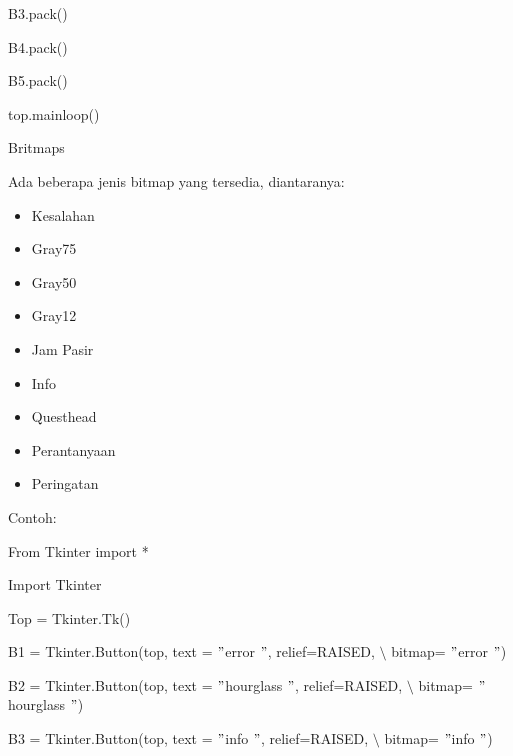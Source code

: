\begin{itemize}
{\fontsize{10pt}{10pt}\selectfont B3.pack()} \par
{\fontsize{10pt}{10pt}\selectfont B4.pack()} \par
{\fontsize{10pt}{10pt}\selectfont B5.pack()} \par
{\fontsize{10pt}{10pt}\selectfont top.mainloop()} \par
\noindent 
Britmaps \par
\noindent 
Ada beberapa jenis bitmap yang tersedia, diantaranya: \par
\noindent 
\begin{itemize}
\item Kesalahan \par
\noindent 
\item Gray75 \par
\noindent 
\item Gray50 \par
\noindent 
\item Gray12 \par
\noindent 
\item Jam Pasir \par
\noindent 
\item Info \par
\noindent 
\item Questhead \par
\noindent 
\item Perantanyaan  \par
\noindent 
\item Peringatan\end{itemize}
 \par
\vspace{12pt}
Contoh: \par
{\fontsize{10pt}{10pt}\selectfont From Tkinter import *} \par
{\fontsize{10pt}{10pt}\selectfont Import Tkinter} \par
\vspace{10pt}
{\fontsize{10pt}{10pt}\selectfont Top = Tkinter.Tk()} \par
\vspace{10pt}
{\fontsize{10pt}{10pt}\selectfont B1 = Tkinter.Button(top, text = $ " $error $ " $, relief=RAISED,  $  \setminus  $ bitmap= $ " $error $ " $)} \par
{\fontsize{10pt}{10pt}\selectfont B2 = Tkinter.Button(top, text = $ " $hourglass $ " $, relief=RAISED,  $  \setminus  $ bitmap= $ " $hourglass $ " $)} \par
{\fontsize{10pt}{10pt}\selectfont B3 = Tkinter.Button(top, text = $ " $info $ " $, relief=RAISED,  $  \setminus  $ bitmap= $ " $info $ " $)} \par

\end{itemize}
